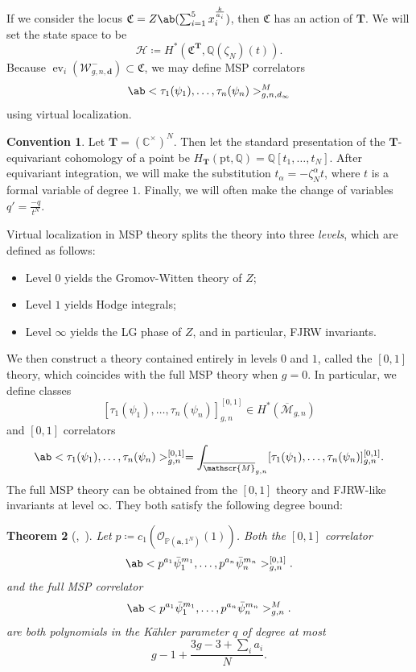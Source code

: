 \documentclass[10pt]{amsart}
\newtheorem{thm}{Theorem}[section]
\theoremstyle{definition}
\newtheorem{conv}[thm]{Convention}
\theoremstyle{remark}
\theoremstyle{plain}
\theoremstyle{definition}
\theoremstyle{remark}
\newcommand{\C}{\mathbb{C}}
\newcommand{\Q}{\mathbb{Q}}
\newcommand{\bd}{\mathbf{d}}
\newcommand{\ba}{\mathbf{a}}
\renewcommand{\P}{\mathbb{P}}
\newcommand{\mc}[1]{\mathcal{#1}}
\newcommand{\msc}[1]{\mathscr{#1}}
\newcommand{\T}{\mathbf{T}}
\newcommand{\mf}[1]{\mathfrak{#1}}
\newcommand{\mr}[1]{\mathrm{#1}}
\newcommand{\ol}[1]{\overline{#1}}
\newcommand{\1}{\mathbf{1}}
\newcommand{\2}{\mathbf{2}}
\newcommand{\3}{\mathbf{3}}
\DeclareMathOperator{\ev}{ev}
\numberwithin{equation}{section}
\begin{document}
If we consider the locus $\mf{C} = Z\ab(\sum_{i=1}^5 x_i^{\frac{k}{a_i}})$, then $\mf{C}$ has an action of $\T$. We will set the state space to be
\[ \msc{H} \coloneqq H^*(\mf{C}^{\T}, \Q(\zeta_N)(t)). \]
Because $\ev_i(\msc{W}_{g,n,\bd}^-) \subset \mf{C}$, we may define MSP correlators
\[ \ab<\tau_1(\psi_1), \ldots, \tau_n(\psi_n)>_{g,n,d_{\infty}}^M \]
using virtual localization. 

\begin{conv}\label{conv:eqvar}
    Let $\T = (\C^{\times})^N$. Then let the standard presentation of the $\T$-equivariant cohomology of a point be $H_{\T}(\mr{pt}, \Q) = \Q[t_1, \ldots, t_N]$. After equivariant integration, we will make the substitution $t_{\alpha} = - \zeta_N^{\alpha} t$, where $t$ is a formal variable of degree $1$. Finally, we will often make the change of variables $q' = \frac{-q}{t^N}$.
\end{conv}

Virtual localization in MSP theory splits the theory into three \textit{levels}, which are defined as follows:
\begin{itemize}
    \item Level $0$ yields the Gromov-Witten theory of $Z$;
    \item Level $1$ yields Hodge integrals;
    \item Level $\infty$ yields the LG phase of $Z$, and in particular, FJRW invariants.
\end{itemize}

We then construct a theory contained entirely in levels $0$ and $1$, called the $[0,1]$ theory, which coincides with the full MSP theory when $g=0$. In particular, we define classes
\[ [\tau_1(\psi_1), \ldots, \tau_n(\psi_n)]_{g,n}^{[0,1]} \in H^*(\ol{\msc{M}}_{g,n}) \]
and $[0,1]$ correlators
\[ \ab<\tau_1(\psi_1), \ldots, \tau_n(\psi_n)>_{g,n}^{[0,1]} = \int_{\ol{\msc{M}}_{g,n}} [\tau_1(\psi_1), \ldots, \tau_n(\psi_n)]_{g,n}^{[0,1]}. \]
The full MSP theory can be obtained from the $[0,1]$ theory and FJRW-like invariants at level $\infty$. They both satisfy the following degree bound:
\begin{thm}[,~]\label{thm:intropoly01}
    Let $p \coloneqq c_1(\mc{O}_{\P(\ba, 1^N)}(1))$.
    Both the $[0,1]$ correlator
    \[ \ab<p^{a_1} \bar{\psi}_1^{m_1}, \ldots, p^{a_n}\bar{\psi}_n^{m_n}>_{g,n}^{[0,1]}. \]
    and the full MSP correlator
    \[ \ab<p^{a_1} \bar{\psi}_1^{m_1}, \ldots, p^{a_n}\bar{\psi}_n^{m_n}>_{g,n}^{M}. \]
    are both polynomials in the K\"ahler parameter $q$ of degree at most
    \[ g-1 + \frac{3g-3 + \sum_i a_i}{N}. \]
\end{thm}
\end{document}
